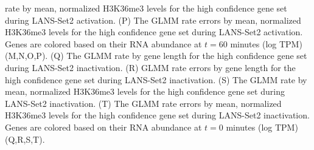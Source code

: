 \documentclass[11pt]{biorxiv}
\begin{document}
rate by mean, normalized H3K36me3 levels for the high confidence gene set during LANS-Set2 activation. (P) The GLMM rate errors by mean, normalized H3K36me3 levels for the high confidence gene set during LANS-Set2 activation. Genes are colored based on their RNA abundance at $t=60$ minutes (log TPM) (M,N,O,P). (Q) The GLMM rate by gene length for the high confidence gene set during LANS-Set2 inactivation. (R) GLMM rate errors by gene length for the high confidence gene set during LANS-Set2 inactivation. (S) The GLMM rate by mean, normalized H3K36me3 levels for the high confidence gene set during LANS-Set2 inactivation. (T) The GLMM rate errors by mean, normalized H3K36me3 levels for the high confidence gene set during LANS-Set2 inactivation. Genes are colored based on their RNA abundance at $t=0$ minutes (log TPM) (Q,R,S,T). 

\clearpage
\end{document}
